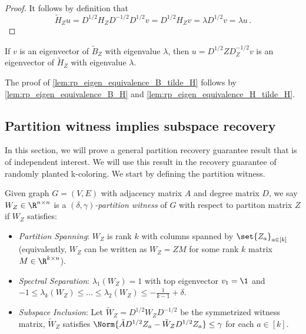 \begin{proof}
    It follows by definition that
    \begin{equation*}
        \tilde{H}_Z u
        = D^{1/2} H_Z D^{-1/2} D^{1/2} v
        = D^{1/2} H_Z v
        = \lambda D^{1/2} v
        = \lambda u \,.
    \end{equation*}
\end{proof}

\begin{corollary}
\label{lem:rp_eigen_equivalence_B_tilde_H}
    If $v$ is an eigenvector of $\tilde{B}_Z$ with eigenvalue $\lambda$, then $u = D^{1/2} Z D_Z^{-1/2} v$ is an eigenvector of $\tilde{H}_Z$ with eigenvalue $\lambda$.
\end{corollary}

The proof of \cref{lem:rp_eigen_equivalence_B_tilde_H} follows by \cref{lem:rp_eigen_equivalence_B_H} and \cref{lem:rp_eigen_equivalence_H_tilde_H}.

\subsection{Partition witness implies subspace recovery}

In this section, we will prove a general partition recovery guarantee result that is of independent interest. We will use this result in the recovery guarantee of randomly planted k-coloring. We start by defining the partition witness.

\begin{definition}
\label{def:rp_partition_witness}
    Given graph $G=(V, E)$ with adjacency matrix $A$ and degree matrix $D$, we say $W_Z \in \R^{n \times n}$ is a \emph{$(\delta, \gamma)$-partition witness} of $G$ with respect to partiton matrix $Z$ if $W_Z$ satisfies:
    \begin{itemize}
        \item \emph{Partition Spanning}: $W_Z$ is rank $k$ with columns spanned by $\set{Z_a}_{a \in [k]}$ (equivalently, $W_Z$ can be written as $W_Z = Z M$ for some rank $k$ matrix $M \in \R^{k \times n}$).
        \item \emph{Spectral Separation}: $\lambda_1(W_Z) = 1$ with top eigenvector $v_1=\1$ and $-1 \leq \lambda_k(W_Z) \leq \dots \leq  \lambda_2(W_Z) \leq - \frac{1}{k-1} + \delta$.
        \item \emph{Subspace Inclusion}: Let $\tilde{W}_Z = D^{1/2} W_Z D^{- 1/2}$ be the symmetrized witness matrix, $\tilde{W}_Z$ satisfies $\Norm{\tilde{A} D^{1/2} Z_a - \tilde{W}_Z  D^{1/2} Z_a} \leq \gamma$ for each $a \in [k]$.
    \end{itemize}
\end{definition}


